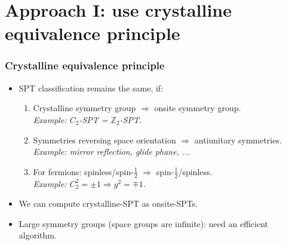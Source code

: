 \documentclass[xcolor=table, 11pt, aspectratio=1610]{beamer}
\begin{document}
\section{Approach I: use crystalline equivalence principle}

\begin{frame}
  \frametitle{Crystalline equivalence principle}
  \begin{itemize}
  \item SPT classification remains the same, if:
    \begin{enumerate}
    \item Crystalline symmetry group $\Rightarrow$ onsite symmetry group.\\
      \emph{Example: $C_2$-SPT = $\mathbb Z_2$-SPT.}
    \item Symmetries reversing space orientation $\Rightarrow$ antiunitary symmetries.\\
      \emph{Example: mirror reflection, glide phane, ...}
    \item For fermions: spinless/spin-$\frac12$ $\Rightarrow$ spin-$\frac12$/spinless.\\
      \emph{Example: $C_2^2=\pm1 \Rightarrow g^2=\mp1$.}
    \end{enumerate}
  \item We can compute crystalline-SPT as onsite-SPTs.
  \item Large symmetry groups (space groups are infinite): need an efficient algorithm.
  \end{itemize}
  \begin{center}
  \end{center}
\end{frame}
\end{document}
